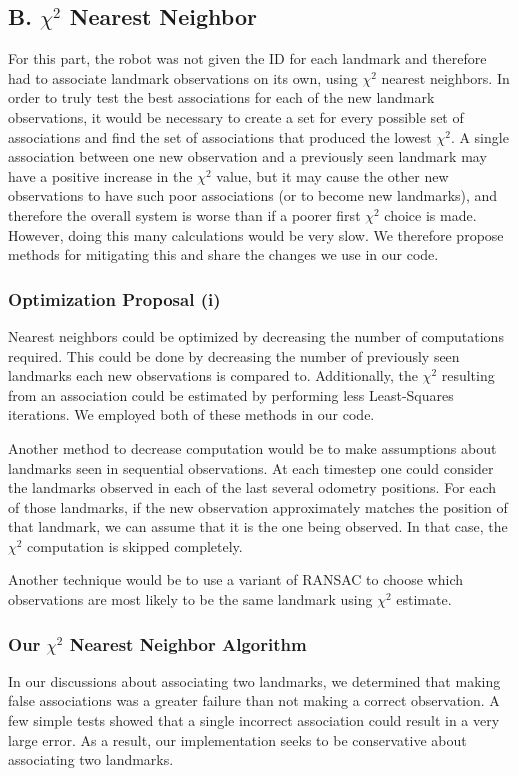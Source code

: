 \documentclass[12pt]{article}
\begin{document}
\subsection*{B. $\chi^2$ Nearest Neighbor}

For this part, the robot was not given the ID for each landmark and therefore had to associate landmark observations on its own, using $\chi^2$ nearest neighbors.  In order to truly test the best associations for each of the new landmark observations, it would be necessary to create a set for every possible set of associations and find the set of associations that produced the lowest $\chi^2$.  A single association between one new observation and a previously seen landmark may have a positive increase in the $\chi^2$ value, but it may cause the other new observations to have such poor associations (or to become new landmarks), and therefore the overall system is worse than if a poorer first $\chi^2$ choice is made.  However, doing this many calculations would be very slow.  We therefore propose methods for mitigating this and share the changes we use in our code.

\subsubsection*{Optimization Proposal (i)}
Nearest neighbors could be optimized by decreasing the number of computations required.  This could be done by decreasing the number of previously seen landmarks each new observations is compared to.  Additionally, the $\chi^2$ resulting from an association could be estimated by performing less Least-Squares iterations. We employed both of these methods in our code.

Another method to decrease computation would be to make assumptions about landmarks seen in sequential observations.  At each timestep one could consider the landmarks observed in each of the last several odometry positions.  For each of those landmarks, if the new observation approximately matches the position of that landmark, we can assume that it is the one being observed. In that case, the $\chi^2$ computation is skipped completely.

Another technique would be to use a variant of RANSAC to choose which observations are most likely to be the same landmark using $\chi^2$ estimate.

\subsubsection*{Our $\chi^2$ Nearest Neighbor Algorithm}
In our discussions about associating two landmarks, we determined that making false associations was a greater failure than not making a correct observation.  A few simple tests showed that a single incorrect association could result in a very large error.  As a result, our implementation seeks to be conservative about associating two landmarks.
\end{document}
